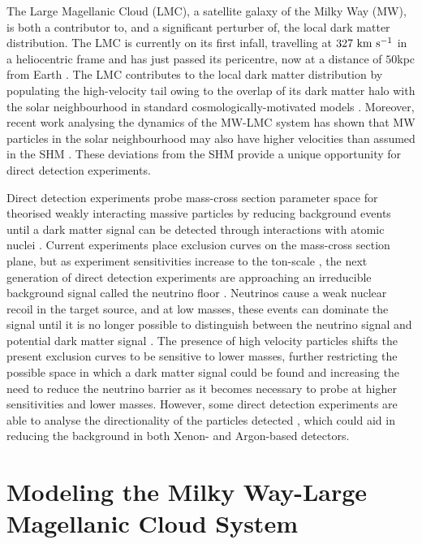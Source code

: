 \documentclass[fleqn,usenatbib]{mnras}
\newcommand{\kms}{{\rm ~km~s^{-1}}}	%
\begin{document}
The Large Magellanic Cloud (LMC), a satellite galaxy of the Milky Way (MW), is both a contributor to, and a significant perturber of, the local dark matter distribution. The LMC is currently on its first infall, travelling at $327 \kms$ in a heliocentric frame \citep{Kallivayalil_2013} and has just passed its pericentre, now at a distance of $50$kpc from Earth \citep{Pietrzynski_2019}. The LMC contributes to the local dark matter distribution by populating the high-velocity tail owing to the overlap of its dark matter halo with the solar neighbourhood in standard cosmologically-motivated models \citep{Besla_2019}. Moreover, recent work analysing the dynamics of the MW-LMC system has shown that MW particles in the solar neighbourhood may also have higher velocities than assumed in the SHM \citep{ Petersen..reflexmotion..2020}. These deviations from the SHM provide a unique opportunity for direct detection experiments.

Direct detection experiments probe mass-cross section parameter space for theorised weakly interacting massive particles by reducing background events until a dark matter signal can be detected through interactions with atomic nuclei \citep{Lewin_1996}. Current experiments place exclusion curves on the mass-cross section plane, but as experiment sensitivities increase to the ton-scale \citep[e.g.][]{Aprile_2017}, the next generation of direct detection experiments are approaching an irreducible background signal called the neutrino floor \citep{Boehm_2019}. Neutrinos cause a weak nuclear recoil in the target source, and at low masses, these events can dominate the signal until it is no longer possible to distinguish between the neutrino signal and potential dark matter signal \citep{Grothaus_2014}. The presence of high velocity particles shifts the present exclusion curves to be sensitive to lower masses, further restricting the possible space in which a dark matter signal could be found and increasing the need to reduce the neutrino barrier as it becomes necessary to probe at higher sensitivities and lower masses. However, some direct detection experiments are able to analyse the directionality of the particles detected \citep{Grothaus_2014}, which could aid in reducing the background in both Xenon- \citep{Nygren_2013} and Argon-based \citep{Akimov_2020} detectors.  


\vspace{-0.5cm}

\section{Modeling the Milky Way-Large Magellanic Cloud System} \label{Section:Model}
\end{document}
